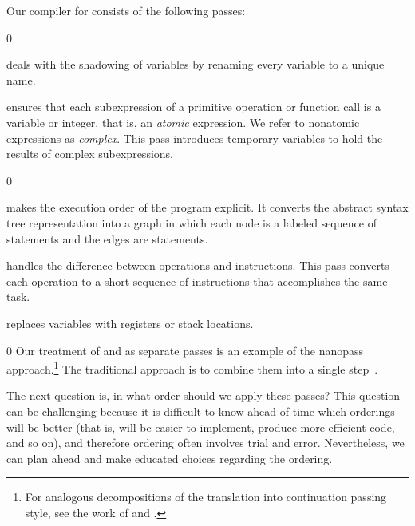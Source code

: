 \documentclass[7x10]{TimesAPriori_MIT}%
\def\racketEd{0}
\def\edition{1}
\numberwithin{theorem}{chapter}
\numberwithin{definition}{chapter}
\numberwithin{equation}{chapter}
\begin{document}
Our compiler for \LangVar{} consists of the following passes:
%
\begin{description}
{\if\edition\racketEd
\item[\key{uniquify}] deals with the shadowing of variables by
  renaming every variable to a unique name.
  \fi}

\item[\key{remove\_complex\_operands}] ensures that each subexpression
  of a primitive operation or function call is a variable or integer,
  that is, an \emph{atomic} expression. We refer to nonatomic
  expressions as \emph{complex}.  This pass introduces temporary
  variables to hold the results of complex
  subexpressions.%
  
{\if\edition\racketEd
\item[\key{explicate\_control}] makes the execution order of the
  program explicit. It converts the abstract syntax tree
  representation into a graph in which each node is a labeled sequence
  of statements and the edges are  statements.
\fi}

\item[\key{select\_instructions}]
  handles the difference between
  \LangVar{} operations and {\ArchName} instructions. This pass converts each
  \LangVar{} operation to a short sequence of instructions that
  accomplishes the same task.

\item[\key{assign\_homes}] replaces variables with registers or stack
  locations.
\end{description}
%
{\if\edition\racketEd
%
Our treatment of  and
 as separate passes is an example of the
nanopass approach.\footnote{For analogous decompositions of the
  translation into continuation passing style, see the work of
  \citet{Lawall:1993} and \citet{Hatcliff:1994ea}.} The traditional
approach is to combine them into a single step~\citep{Aho:2006wb}.
%  
\fi}

The next question is, in what order should we apply these passes? This
question can be challenging because it is difficult to know ahead of
time which orderings will be better (that is, will be easier to
implement, produce more efficient code, and so on), and therefore
ordering often involves trial and error. Nevertheless, we can plan
ahead and make educated choices regarding the ordering.
\end{document}
